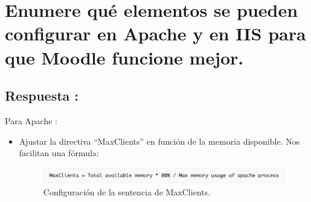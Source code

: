 \newpage
\section{Enumere qué elementos se pueden configurar en Apache y en IIS para que Moodle funcione mejor.}
\subsection{Respuesta : }

Para Apache :

\begin{itemize}
	\item Ajustar la directiva ``MaxClients'' en función de la memoria disponible. Nos facilitan una fórmula:
	\begin{figure}[H]
	\begin{center}
		\includegraphics[width=15cm]{Imagenes/MaxClients}
		\caption{Configuración de la sentencia de MaxClients.}
		\label{fig:22}
	\end{center}
\end{figure}


\end{itemize}
